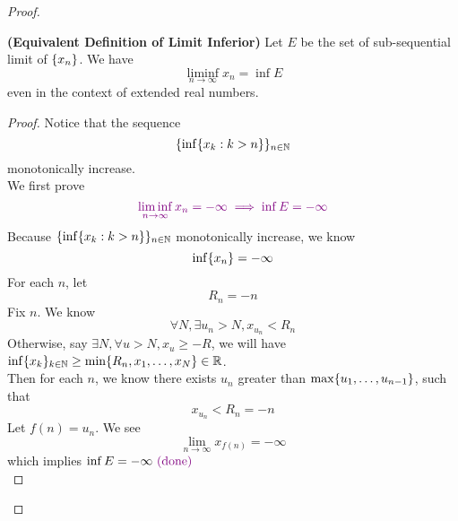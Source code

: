 \documentclass{report}
\begin{document}
\begin{proof}
{\begin{minipage}{39em}
\end{minipage}}

\begin{theorem}
\label{4.3.8}
\textbf{(Equivalent Definition of Limit Inferior)} Let $E$ be the set of sub-sequential limit of $\{ x_n \}$. We have
\begin{equation}
\liminf_{n\to\infty} x_n=\inf E
\end{equation}
even in the context of extended real numbers. 
\end{theorem}
\begin{proof}
Notice that the sequence 
\begin{equation}
\{ \inf \{ x_k:k>n \} \}_{n\in\mathbb{N}}
\end{equation}
monotonically increase.\\

We first prove
\begin{equation}
\textcolor{violet}{\liminf_{n\to\infty} x_n=-\infty\implies \inf E=-\infty}
\end{equation}
Because $\{ \inf \{ x_k:k>n \} \}_{n\in\mathbb{N}}$ monotonically increase, we know
\begin{equation}
\inf \{ x_n \}=-\infty
\end{equation}
For each $n$,  let 
\begin{equation}
R_n=-n
\end{equation}
Fix $n$. We know 
\begin{equation}
\forall N, \exists u_n>N,x_{u_n}<R_n
\end{equation}
Otherwise, say $\exists N,\forall u>N, x_u\geq -R$, we will have $\inf \{ x_k \}_{k\in\mathbb{N}}\geq \min \{ R_n,x_1,\dots ,x_N \}\in\mathbb{R}$.\\

Then for each $n$, we know there exists $u_n$ greater than  $\max \{ u_1,\dots , u_{n-1} \}$, such that 
\begin{equation}
x_{u_n}<R_n=-n
\end{equation}
Let $f(n)=u_n$. We see
\begin{equation}
\lim_{n\to\infty}x_{f(n)}=-\infty 
\end{equation}
which implies $\inf E=-\infty\textcolor{violet}{\text{ (done) }}$\\


\end{proof}
\end{proof}
\end{document}
